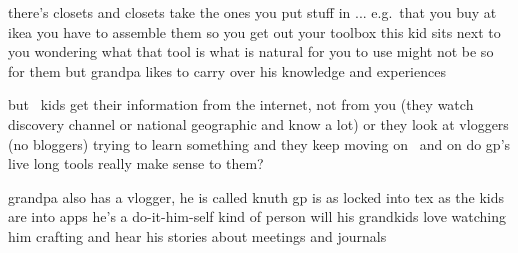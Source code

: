 
\startdocument

\startstandardmakeup[bottom=,top=]

    \raggedcenter

    \vfil\vfil
    \dontleavehmode{}
    \vfil
    \dontleavehmode{}
    \vfil
    \dontleavehmode{}
    \vfil
    \dontleavehmode{}
    \vfil
    \dontleavehmode{}
    \vfil
    \dontleavehmode{}
    \vfil
    \vfil
    \dontleavehmode{}
    \vfil\vfil\vfil\vfil

\stopstandardmakeup


\startsection[title={closets}]
    \startitemize
    \startitem there's closets and closets \stopitem
    \startitem take the ones you put stuff in ... e.g.\ that you buy at ikea \stopitem
    \startitem you have to assemble them so you get out your toolbox \stopitem
    \startitem this kid sits next to you wondering what that tool is \stopitem
    \startitem what is natural for you to use might not be so for them \stopitem
    \startitem but grandpa likes to carry over his knowledge and experiences \stopitem
    \stopitemize
\stopsection


\startsection[title={interest}]
    \startitemize
    \startitem but \unknown\ kids get their information from the internet, not from you \stopitem
    \startitem (they watch discovery channel or national geographic and know a lot) \stopitem
    \startitem or they look at vloggers (no bloggers) trying to learn something \stopitem
    \startitem and they keep moving on \unknown\ and on \stopitem
    \startitem do gp's live long tools really make sense to them? \stopitem
    \stopitemize
\stopsection

\startsection[title={grandpas}]
    \startitemize
    \startitem grandpa also has a vlogger, he is called knuth \stopitem
    \startitem gp is as locked into tex as the kids are into apps \stopitem
    \startitem he's a do-it-him-self kind of person \stopitem
    \startitem will his grandkids love watching him crafting \stopitem
    \startitem and hear his stories about meetings and journals \stopitem
    \stopitemize
\stopsection


